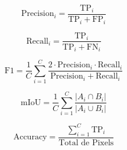\documentclass{article}
\begin{document}
\begin{multicols}{2}

\[
\text{Precision}_i = \frac{\text{TP}_i}{\text{TP}_i + \text{FP}_i}
\]

\[
\text{Recall}_i = \frac{\text{TP}_i}{\text{TP}_i + \text{FN}_i}
\]

\[
\text{F1} = \frac{1}{C} \sum_{i=1}^C \frac{2 \cdot \text{Precision}_i \cdot \text{Recall}_i}{\text{Precision}_i + \text{Recall}_i}
\]

\columnbreak

\[
\text{mIoU} = \frac{1}{C} \sum_{i=1}^C \frac{|A_i \cap B_i|}{|A_i \cup B_i|}
\]

\[
\text{Accuracy} = \frac{\sum_{i=1}^C \text{TP}_i}{\text{Total de Pixels}}
\]

\end{multicols}
\end{document}

